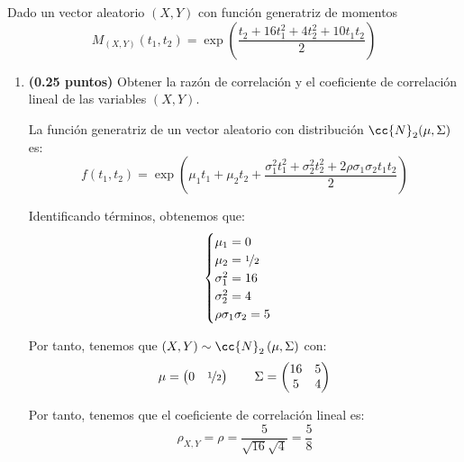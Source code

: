 \documentclass[12pt]{article}
\begin{document}
    \begin{ejercicio}[1 puntos]
        Dado un vector aleatorio $(X,Y)$ con función generatriz de momentos
        \begin{equation*}
            M_{(X,Y)}(t_1,t_2) = \exp\left(\dfrac{t_2+16t_1^2 + 4t_2^2 + 10t_1t_2}{2}\right)
        \end{equation*}
        \begin{enumerate}
            \item \textbf{(0.25 puntos)} Obtener la razón de correlación y el coeficiente de correlación lineal de las variables $(X,Y)$.
            
            La función generatriz de un vector aleatorio con distribución $\cc{N}_2(\mu,\Sigma)$ es:
            \begin{equation*}
                f(t_1,t_2) = \exp\left(\mu_1t_1+\mu_2t_2+\dfrac{\sigma_1^2t_1^2+\sigma_2^2t_2^2+2\rho\sigma_1\sigma_2t_1t_2}{2}\right)
            \end{equation*}

            Identificando términos, obtenemos que:
            \begin{equation*}
                \begin{cases}
                    \mu_1 = 0 \\
                    \mu_2 = \nicefrac{1}{2} \\
                    \sigma_1^2 = 16 \\
                    \sigma_2^2 = 4 \\
                    \rho\sigma_1\sigma_2 = 5
                \end{cases}
            \end{equation*}

            Por tanto, tenemos que $(X,Y)\sim \cc{N}_2\left(\mu,\Sigma\right)$ con:
            \begin{equation*}
                \mu = \begin{pmatrix}
                    0 & \nicefrac{1}{2}
                \end{pmatrix} \qquad \Sigma = \begin{pmatrix}
                    16 & 5 \\ 5 & 4
                \end{pmatrix}
            \end{equation*}

            Por tanto, tenemos que el coeficiente de correlación lineal es:
            \begin{equation*}
                \rho_{X,Y}=\rho=\dfrac{5}{\sqrt{16}\sqrt{4}} = \dfrac{5}{8}
            \end{equation*}


\end{enumerate}
\end{ejercicio}
\end{document}
